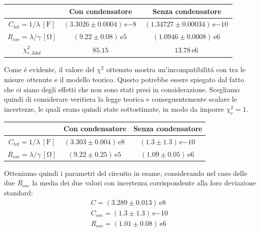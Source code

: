\documentclass{article}
\newcommand{\E}[1]{\, \mathrm{e}{#1} \, }
\begin{document}
\begin{center}
\begin{tabular}{c | c c} 
& Con condensatore  & Senza condensatore \\
[0.5ex]
\hline
$C_{tot}=1/\lambda \ [\si{\farad}]$ &$ (3.3026\pm 0.0004)\E{-8} $&$ (1.34727\pm 0.00034)\E{-10} $\\
$R_{osc}=\lambda/\gamma \ [\si{\ohm}]$ &$ (9.22\pm 0.08)\E{5} $&$ (1.0946\pm 0.0008)\E{6} $\\
$\chi^2_{r,\mathrm{3 dof}}$& $85.15$ & $13.78\E{6}$ \\

\end{tabular}
\end{center}

Come \'e evidente, il valore del $\chi^2$ ottenuto mostra un'incompatibilit\'a con tra le misure ottenute e il modello teorico. Questo potrebbe essere spiegato dal fatto che ci siano degli effetti che non sono stati presi in considerazione. Scegliamo quindi di considerare veritiera la legge teorica e conseguentemente scalare le incertezze, le quali erano quindi state sottostimate, in modo da imporre $\chi^2_r=1$.\\

\begin{center}
\begin{tabular}{c | c c} 
& Con condensatore  & Senza condensatore \\
[0.5ex]
\hline
$C_{tot}=1/\lambda \ [\si{\farad}]$ &$ (3.303\pm 0.004)\E{8} $&$ (1.3\pm 1.3)\E{-10} $\\
$R_{osc}=\lambda/\gamma \ [\si{\ohm}]$ &$ (9.22\pm 0.25)\E{5} $&$ (1.09\pm 0.05)\E{6} $\\
\end{tabular}
\end{center}

Otteniamo quindi i parametri del circuito in esame, considerando nel caso delle due $R_{osc}$ la media dei due valori con incertezza corrispondente alla loro deviazione standard: \\

\begin{gather}
	\nonumber
	C=(3.289\pm 0.013)\E{8}\\
	\nonumber
	C_{osc}=(1.3\pm 1.3)\E{-10} \\
	\nonumber
	R_{osc}=(1.01\pm 0.08)\E{6} \\
\end{gather}

\newpage
\end{document}
